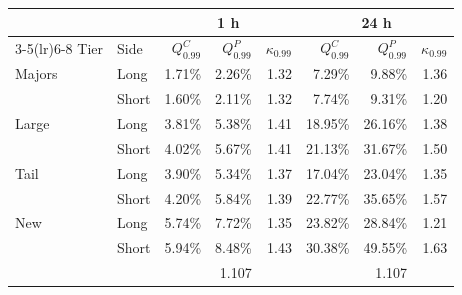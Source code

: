 \begin{tabular}{@{}llrrrrrr@{}}
\toprule
 & & \multicolumn{3}{c}{1 h} & \multicolumn{3}{c}{24 h} \\
\cmidrule(lr){3-5}\cmidrule(lr){6-8}
Tier & Side & $Q_{0.99}^{C}$ & $Q_{0.99}^{P}$ & $\kappa_{0.99}$ & $Q_{0.99}^{C}$ & $Q_{0.99}^{P}$ & $\kappa_{0.99}$ \\
\midrule
Majors & Long & 1.71\% & 2.26\% & 1.32 & 7.29\% & 9.88\% & 1.36 \\
 & Short & 1.60\% & 2.11\% & 1.32 & 7.74\% & 9.31\% & 1.20 \\
\addlinespace[2pt]
Large & Long & 3.81\% & 5.38\% & 1.41 & 18.95\% & 26.16\% & 1.38 \\
 & Short & 4.02\% & 5.67\% & 1.41 & 21.13\% & 31.67\% & 1.50 \\
\addlinespace[2pt]
Tail & Long & 3.90\% & 5.34\% & 1.37 & 17.04\% & 23.04\% & 1.35 \\
 & Short & 4.20\% & 5.84\% & 1.39 & 22.77\% & 35.65\% & 1.57 \\
\addlinespace[2pt]
New & Long & 5.74\% & 7.72\% & 1.35 & 23.82\% & 28.84\% & 1.21 \\
 & Short & 5.94\% & 8.48\% & 1.43 & 30.38\% & 49.55\% & 1.63 \\
\addlinespace[2pt]
\multicolumn{2}{@{}l}{Brownian benchmark} & & & 1.107 & & & 1.107 \\
\bottomrule
\end{tabular}
